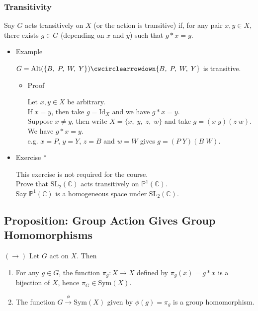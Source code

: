 \documentclass[11pt]{article}
\newcommand{\0}{\emptyset}
\newcommand{\C}{\mathbb{C}}
\begin{document}
\subsubsection*{Transitivity}
\label{sec:org3adc792}
Say \(G\) acts transitively on \(X\) (or the action is transitive) if, for any pair \(x,y\in X\), there exists \(g\in G\) (depending on \(x\) and \(y\)) such that \(g*x=y\).\\[0pt]
\begin{itemize}
\item Example
\label{sec:org2b0bec9}

\(G=\text{Alt}(\{B,\;P,\;W,\;Y\}) \cwcirclearrowdown \{B,\;P,\;W,\;Y\}\) is transitive.\\[0pt]
\begin{itemize}
\item Proof
\label{sec:org7f159c0}

Let \(x,y\in X\) be arbitrary.\\[0pt]
If \(x=y\), then take \(g=\text{Id}_{X}\) and we have \(g*x=y\).\\[0pt]
Suppose \(x\neq y\), then write \(X=\{x,\;y,\;z,\;w\}\) and take \(g=(x\;y)(z\;w)\). We have \(g*x=y\).\\[0pt]
e.g. \(x=P\), \(y=Y\), \(z=B\) and \(w=W\) gives \(g=(P\;Y)(B\;W)\).\\[0pt]
\end{itemize}
\item Exercise *
\label{sec:org64f13d9}

This exercise is not required for the course.\\[0pt]
Prove that \(\text{SL}_{2}(\C)\) acts transitively on \(\mathbb{P}^{1}(\C)\).\\[0pt]
Say \(\mathbb{P}^{1}(\C)\) is a homogeneous space under \(\text{SL}_{2}(\C)\).\\[0pt]
\end{itemize}
\subsection*{Proposition: Group Action Gives Group Homomorphisms}
\label{sec:org0ee88f6}
\((\longrightarrow)\) Let \(G\) act on \(X\). Then\\[0pt]
\begin{enumerate}
\item For any \(g\in G\), the function \(\pi_{g}:X\to X\) defined by \(\pi_{g}(x)=g*x\) is a bijection of \(X\), hence \(\pi_{G}\in\text{Sym}(X)\).\\[0pt]
\item The function \(G\overset{\phi}{\to}\text{Sym}(X)\) given by \(\phi(g)=\pi_{g}\) is a group homomorphism.\\[0pt]
\end{enumerate}
\end{document}
